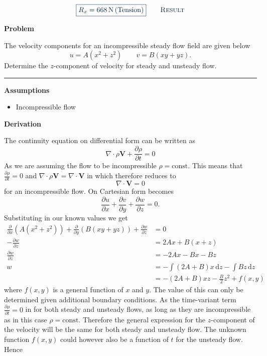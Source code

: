 \documentclass[a4paper]{article}
\renewcommand{\Vec}[1]{\boldsymbol{#1}}
\newcounter{problem}
\renewcommand{\theproblem}{\arabic{problem}}
\numberwithin{equation}{problem}
\newenvironment{problem}%
{%
  \refstepcounter{problem}%
  \par\vspace{0pt}%
  {\large\bfseries\sffamily\color{AUblueDark}%
    Problem \theproblem%
  }%
  \par\vspace{.35\baselineskip}%
}%
{%
  \par\vspace{.6\baselineskip}%
  {\color{AUblueDark}\rule{\linewidth}{0.8pt}}%
  \vspace{.6\baselineskip}\par%
}
\newcommand{\AUheading}[1]{%
  \par\vspace{.4\baselineskip}%
  {\sffamily\bfseries\color{AUblueDark}#1\par}%
  \nobreak%
}
\newenvironment{assumptions}[1][Assumptions]{%
  \AUheading{#1}
  \begin{itemize}[leftmargin=*,nosep]
}{\end{itemize}\par\medskip}
\newenvironment{derivation}[1][Derivation]{%
  \AUheading{#1}
  \begingroup\allowdisplaybreaks
  \setlength{\abovedisplayskip}{6pt}%
  \setlength{\belowdisplayskip}{6pt}%
  \setlength{\abovedisplayshortskip}{4pt}%
  \setlength{\belowdisplayshortskip}{4pt}%
}{\par\endgroup\medskip}
\newcommand{\finalresult}[1]{%
  \vspace{.2\baselineskip}%
  \begin{equation}
    {\color{AUblueDark}\boxed{\displaystyle #1}}
    \tag*{\textsc{\textcolor{AUblueDark}{Result}}}
  \end{equation}
  \newpage
}
\begin{document}
\finalresult{R_x = \qty{668}{\newton} \,  (\text{Tension})}




\begin{problem}
The velocity components for an incompressible steady flow field are given below
\[ 
u = A \left( x^2 + z^2 \right) \qquad v = B \left( xy + yz \right)
.\]
Determine the $z$-component of velocity for steady and unsteady flow.
\end{problem}

\begin{assumptions}
  \item Incompressible flow
\end{assumptions}

\begin{derivation}
The continuity equation on differential form can be written as
\begin{equation} \label{eq:convec}
  \nabla \cdot \rho \Vec{V} + \frac{\partial \rho}{\partial t} = 0
\end{equation}
As we are assuming the flow to be incompressible $\rho = \mathrm{const.}$
This means that $\frac{\partial \rho}{\partial t} = 0$ and $\nabla \cdot \rho \Vec{V} = \nabla \cdot \Vec{V}$ in  which therefore reduces to
\begin{equation} \label{eq:convecinc}
  \nabla \cdot \Vec{V} = 0
\end{equation}
for an incompressible flow.
On Cartesian form  becomes
\[ 
\frac{\partial u}{\partial x} + \frac{\partial v}{\partial y} + \frac{\partial w}{\partial z} = 0
.\]
Substituting in our known values we get
\begin{align*}
\frac{\partial }{\partial x} \left( A \left( x^2 + z^2 \right) \right) + \frac{\partial}{\partial y} \left( B \left( xy + yz \right) \right) + \frac{\partial w}{\partial z} &= 0 \\
  - \frac{\partial w}{\partial z} &= 2Ax + B \left( x+z \right) \\
  \frac{\partial w}{\partial z} &= -2Ax - Bx - Bz \\
  w &= - \int \left( 2A + B \right)x \, \mathrm{d}z - \int Bz \, \mathrm{d}z \\
  &= - \left( 2A + B \right)xz - \frac{B}{2} z^2 + f(x,y)
\end{align*}
where $f(x,y)$ is a general function of $x$ and $y$. The value of this can only be determined given additional boundary conditions.
As the time-variant term $\frac{\partial \rho}{\partial t} = 0$ in  for both steady and unsteady flows, as long as they are incompressible as in this case $\rho = \mathrm{const.}$
Therefore the general expression for the $z$-component of the velocity will be the same for both steady and unsteady flow. The unknown function $f(x,y)$ could however also be a function of $t$ for the unsteady flow. Hence


\end{derivation}
\end{document}
